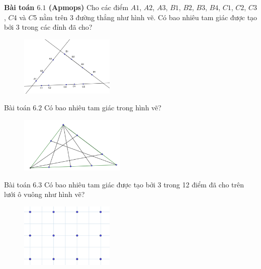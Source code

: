 \begin{multicols}{2}
	\vspace*{-10pt}
	\begin{multicols}{2}
		\textbf{Bài toán $6.1$ (Apmops)}
		\vskip 0.1cm
		Cho các điểm $A1$, $A2$, $A3$, $B1$, $B2$, $B3$, $B4$, $C1$, $C2$, $C3$, $C4$ và $C5$ nằm trên $3$ đường thẳng như hình vẽ. Có bao nhiêu tam giác được tạo bởi $3$ trong các đỉnh đã cho?
		\begin{figure}[H]
			\centering
			\vspace*{-5pt}
			\captionsetup{labelformat=empty, justification=centering}
			\includegraphics[width=0.4\textwidth]{_10}
			\vspace*{-15pt}
		\end{figure}
		{Bài toán $6.2$}
		Có bao nhiêu tam giác trong hình vẽ?
		\begin{figure}[H]
			\centering
			\vspace*{-10pt}
			\captionsetup{labelformat=empty, justification=centering}
			\includegraphics[width=0.45\textwidth]{_11}
			\vspace*{-5pt}
		\end{figure}
		{Bài toán $6.3$}
		Có bao nhiêu tam giác được tạo bởi 3 trong 12 điểm đã cho trên lưới ô vuông như hình vẽ?
		\begin{figure}[H]
			\centering
			\vspace*{-5pt}
			\captionsetup{labelformat=empty, justification=centering}
			\includegraphics[width=0.4\textwidth]{_12}

\end{figure}
\end{multicols}
\end{multicols}

